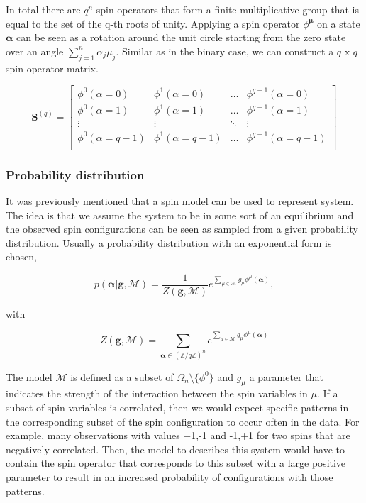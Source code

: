 \noindent
In total there are $q^n$ spin operators that form a finite multiplicative group that is equal to the set of the q-th roots of unity.
Applying a spin operator $\phi^{\boldsymbol{\mu}}$ on a state $\boldsymbol{\alpha}$ can be seen as a rotation around the unit circle starting from the zero state over an angle $\sum_{j=1}^{n}  \alpha_j \mu_j$.
Similar as in the binary case, we can construct a $q$ x $q$ spin operator matrix.

\begin{equation}
    \mathbf{S}^{(q)} = \begin{bmatrix}
        \phi^0(\alpha=0) & \phi^1(\alpha=0) & \hdots &  \phi^{q-1}(\alpha=0)\\
        \phi^0(\alpha=1) & \phi^1(\alpha=1) & \hdots &  \phi^{q-1}(\alpha=1)\\
        \vdots & \vdots & \ddots & \vdots \\
        \phi^0(\alpha=q-1) & \phi^1(\alpha=q-1) & \hdots & \phi^{q-1}(\alpha=q-1)\\
    \end{bmatrix}\label{eq:spin_op_matrix}
\end{equation}

\subsubsection{Probability distribution}

\noindent
It was previously mentioned that a spin model can be used to represent system. The idea is that we assume the system to be in some sort of an equilibrium and the observed spin configurations can be seen as sampled from a given probability distribution.
Usually a probability distribution with an exponential form is chosen,

\begin{equation}\label{eq:prob_distr}
    p(\boldsymbol{\alpha}| \mathbf{g}, \mathcal{M}) = \frac{1}{Z(\mathbf{g}, \mathcal{M})} e^{\sum_{\mu \in \mathcal{M}} g_\mu \phi^\mu(\boldsymbol{\alpha})},
\end{equation}

\noindent
with

\begin{equation}
    Z(\mathbf{g}, \mathcal{M}) = \sum_{\boldsymbol{\alpha} \in {(\mathbb{Z}/q\mathbb{Z})}^n}e^{\sum_{\mu \in \mathcal{M}} g_\mu \phi^\mu(\boldsymbol{\alpha})}
\end{equation}

\noindent
The model $\mathcal{M}$ is defined as a subset of $\Omega_n \setminus \{ \phi^0 \}$ and $g_\mu$ a parameter that indicates the strength of the interaction between the spin variables in $\mu$.
If a subset of spin variables is correlated, then we would expect specific patterns in the corresponding subset of the spin configuration to occur often in the data.
For example, many observations with values +1,-1 and -1,+1 for two spins that are negatively correlated. 
Then, the model to describes this system would have to contain the spin operator that corresponds to this subset with a large positive parameter to result in an increased probability of configurations with those patterns.

